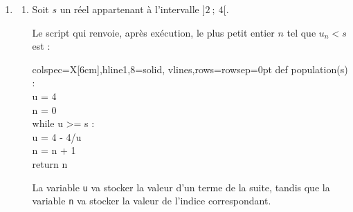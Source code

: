 \begin{enumerate}
\begin{enumerate}
En multipliant chaque membre par $\ell \ne 0$, on obtient $\ell^2  = 4\ell  - 4 \iff \ell^2 - 4\ell + 4 = 0 \iff (\ell - 2)^2 = 0 \iff \ell - 2 = 0 \iff \ell = 2$.

L'unique solution de l'équation étant 2, on a donc $\displaystyle\lim_{n \to + \infty} u_n = 2$.



		\item Ce modèle prévoit une stabilisation de la population à  perches-soleil, et ne prévoit donc pas une élimination à long terme de l'espèce envahissante.
	\end{enumerate}

	\item \begin{enumerate}
		\item Soit $s$ un réel appartenant à l'intervalle $]2~;~4[$.

Le script qui renvoie, après exécution, le plus petit entier $n$ tel que $u_{n}<s$ est :

		\begin{center}
			\begin{ttfamily}
			\begin{tblr}{colspec={X[6cm]},hline{1,8}={solid},
			vlines,rows={rowsep=0pt}}
			def population(s) :\\
			\quad u = 4\\
			\quad n = 0\\
			\quad while u >= s :\\
			\quad \quad u = 4 - 4/u\\
			\quad \quad n = n + 1\\
			\quad return n
			\end{tblr}
		\end{ttfamily}
		\end{center}

La variable \texttt{u} va stocker la valeur d'un terme de la suite, tandis que la variable \texttt{n} va stocker la valeur de l'indice correspondant.


\end{enumerate}
\end{enumerate}
